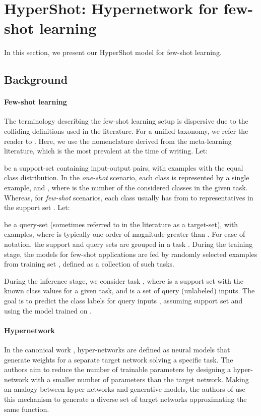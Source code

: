 \documentclass[nohyperref]{article}
\def\our{HyperShot}
\theoremstyle{plain}
\theoremstyle{definition}
\theoremstyle{remark}
\begin{document}
\section{\our{}: Hypernetwork for few-shot learning}

In this section, we present our \our{} model for few-shot learning. 

\subsection{Background}

\paragraph{Few-shot learning}
The terminology describing the few-shot learning setup is dispersive due to the colliding definitions used in the literature. For a unified taxonomy, we refer the reader to \cite{chen2019closer,wang2020fewshotsurvey}. 
Here, we use the nomenclature derived from the meta-learning literature, which is the most prevalent at the time of writing.
Let: 

be a support-set containing input-output pairs, with  examples with the equal class distribution. In the \textit{one-shot} scenario, each class is represented by a single example, and , where  is the number of the considered classes in the given task. Whereas, for \textit{few-shot} scenarios, each class usually has from  to  representatives in the support set . Let:


be a query-set (sometimes referred to in the literature as a target-set), with  examples, where  is typically one order of magnitude greater than . For ease of notation, the support and query sets are grouped in a task . During the training stage, the models for few-shot applications are fed by randomly selected examples from training set ,  defined as a collection of such tasks. 

 During the inference stage, we consider task , where  is a support set with the known class values for a given task, and  is a set of query (unlabeled) inputs. The goal is to predict the class labels for query inputs , assuming support set  and using the model trained on .


\paragraph{Hypernetwork}


In the canonical work \cite{ha2016hypernetworks}, hyper-networks are defined as neural models that generate weights for a separate target network solving a specific task.
The authors aim to reduce the number of trainable parameters by designing a hyper-network with a smaller number of parameters than the target network. Making an analogy between hyper-networks and generative models, the authors of \cite{sheikh2017stochastic} use this
mechanism to generate a diverse set of target networks approximating the same function. 
\end{document}

